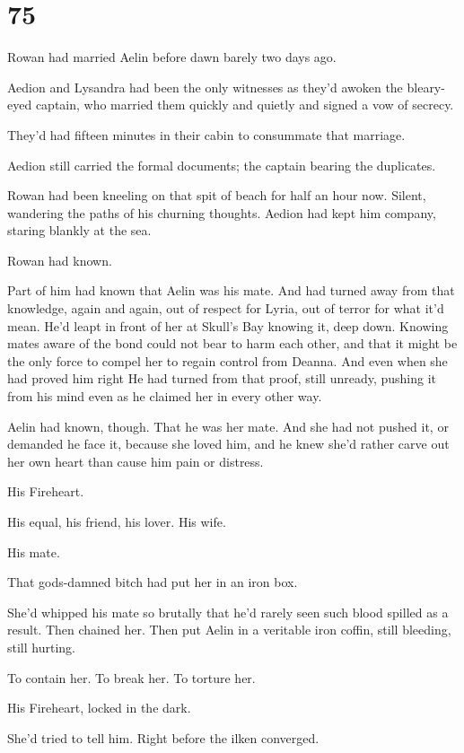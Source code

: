 
\chapter{75}

Rowan had married Aelin before dawn barely two days ago.

Aedion and Lysandra had been the only witnesses as they'd awoken the bleary-eyed captain, who married them quickly and quietly and signed a vow of secrecy.

They'd had fifteen minutes in their cabin to consummate that marriage.

Aedion still carried the formal documents; the captain bearing the duplicates.

Rowan had been kneeling on that spit of beach for half an hour now. Silent, wandering the paths of his churning thoughts. Aedion had kept him company, staring blankly at the sea.

Rowan had known.

Part of him had known that Aelin was his mate. And had turned away from that knowledge, again and again, out of respect for Lyria, out of terror for what it'd mean. He'd leapt in front of her at Skull's Bay knowing it, deep down. Knowing mates aware of the bond could not bear to harm each other, and that it might be the only force to compel her to regain control from Deanna. And even when she had proved him right  He had turned from that proof, still unready, pushing it from his mind even as he claimed her in every other way.

Aelin had known, though. That he was her mate. And she had not pushed it, or demanded he face it, because she loved him, and he knew she'd rather carve out her own heart than cause him pain or distress.

His Fireheart.

His equal, his friend, his lover. His wife.

His mate.

That gods-damned bitch had put her in an iron box.

She'd whipped his mate so brutally that he'd rarely seen such blood spilled as a result. Then chained her. Then put Aelin in a veritable iron coffin, still bleeding, still hurting.

To contain her. To break her. To torture her.

His Fireheart, locked in the dark.

She'd tried to tell him. Right before the ilken converged.

